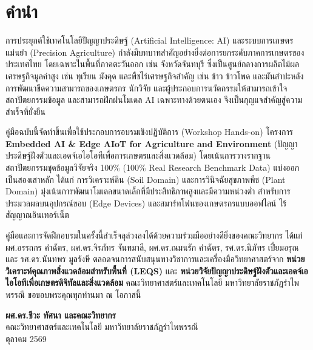 \chapter*{คำนำ}

การประยุกต์ใช้เทคโนโลยีปัญญาประดิษฐ์ (Artificial Intelligence: AI) และระบบการเกษตรแม่นยำ (Precision Agriculture) กำลังมีบทบาทสำคัญอย่างยิ่งต่อการยกระดับภาคการเกษตรของประเทศไทย โดยเฉพาะในพื้นที่ภาคตะวันออก เช่น จังหวัดจันทบุรี ซึ่งเป็นศูนย์กลางการผลิตไม้ผลเศรษฐกิจมูลค่าสูง เช่น ทุเรียน มังคุด และพืชไร่เศรษฐกิจสำคัญ เช่น ข้าว ข้าวโพด และมันสำปะหลัง การพัฒนาขีดความสามารถของเกษตรกร นักวิจัย และผู้ประกอบการนวัตกรรมให้สามารถเข้าใจสถาปัตยกรรมข้อมูล และสามารถฝึกฝนโมเดล AI เฉพาะทางด้วยตนเอง จึงเป็นกุญแจสำคัญสู่ความสำเร็จที่ยั่งยืน

คู่มือฉบับนี้จัดทำขึ้นเพื่อใช้ประกอบการอบรมเชิงปฏิบัติการ (Workshop Hands-on) โครงการ \textbf{Embedded AI \& Edge AIoT for Agriculture and Environment} (ปัญญาประดิษฐ์ฝังตัวและเอดจ์เอไอโอทีเพื่อการเกษตรและสิ่งแวดล้อม) โดยเน้นการวางรากฐานสถาปัตยกรรมชุดข้อมูลวิจัยจริง 100\% (100\% Real Research Benchmark Data) แบ่งออกเป็นสองเสาหลัก ได้แก่ การวิเคราะห์ดิน (Soil Domain) และการวินิจฉัยสุขภาพพืช (Plant Domain) มุ่งเน้นการพัฒนาโมเดลขนาดเล็กที่มีประสิทธิภาพสูงและมีความหน่วงต่ำ สำหรับการประมวลผลบนอุปกรณ์ขอบ (Edge Devices) และสมาร์ทโฟนของเกษตรกรแบบออฟไลน์ ไร้สัญญาณอินเทอร์เน็ต

คู่มือและการจัดฝึกอบรมในครั้งนี้สำเร็จลุล่วงลงได้ด้วยความร่วมมืออย่างดียิ่งของคณะวิทยากร ได้แก่ ผศ.อรรถกร คำฉัตร, ผศ.ดร.จิรภัทร จันทมาลี, ผศ.ดร.ณมนรัก คำฉัตร, รศ.ดร.นิภัทร เปี่ยมอรุณ และ รศ.ดร.นันทพร มูลรังษี ตลอดจนการสนับสนุนทางวิชาการและเครื่องมือวิทยาศาสตร์จาก \textbf{หน่วยวิเคราะห์คุณภาพสิ่งแวดล้อมสำหรับพื้นที่ (LEQS)} และ \textbf{หน่วยวิจัยปัญญาประดิษฐ์ฝังตัวและเอดจ์เอไอโอทีเพื่อเกษตรดิจิทัลและสิ่งแวดล้อม} คณะวิทยาศาสตร์และเทคโนโลยี มหาวิทยาลัยราชภัฏรำไพพรรณี ขอขอบพระคุณทุกท่านมา ณ โอกาสนี้

\vspace{0.25in}
\begin{flushright}
\textbf{ผศ.ดร.ชีวะ ทัศนา และคณะวิทยากร}\\
คณะวิทยาศาสตร์และเทคโนโลยี มหาวิทยาลัยราชภัฏรำไพพรรณี\\
ตุลาคม 2569
\end{flushright}

\cleardoublepage

